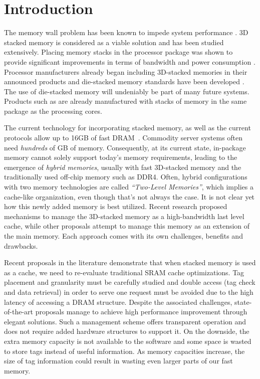 \section{Introduction}
\label{sec:Introduction}

The memory wall problem has been known to impede system performance \cite{wulf-can95}. 3D stacked memory is considered as a viable solution and has been studied extensively. Placing memory stacks in the processor package was shown to provide significant improvements in terms of bandwidth and power consumption \cite{black-micro2013}. Processor manufacturers already began including 3D-stacked memories in their announced products \cite{KnightsLanding,NVIDIA,black-micro2013} and die-stacked memory standards have been developed \cite{jedec-wideio,JEDEC-HBM,pawlowski-hotchips2011}. The use of die-stacked memory will undeniably be part of many future systems. Products such as  are already manufactured with stacks of memory in the same package as the processing cores.

The current technology for incorporating stacked memory, as well as the current protocols allow up to 16GB of
fast DRAM~\cite{KnightsLanding}. Commodity server systems often need {\em hundreds} of GB of memory. Consequently, at its current state, in-package memory cannot solely support today's memory requirements, leading to the emergence of \emph{hybrid memories}, usually with fast 3D-stacked memory and the traditionally used off-chip memory such as DDR4. Often, hybrid configurations with two memory technologies are called \emph{``Two-Level Memories''}, which implies a cache-like organization, even though that's not always the case. It is not clear yet how this newly added memory is best utilized. Recent research proposed mechanisms to manage the 3D-stacked memory as a high-bandwidth last level cache, while other proposals attempt to manage this memory as an extension of the main memory. Each approach comes with its own challenges, benefits and drawbacks. 

Recent proposals in the literature \cite{chou-micro2014,qureshi-micro2012} demonstrate that when stacked memory is used as a cache, we need to re-evaluate traditional SRAM cache optimizations. Tag placement and granularity must be carefully studied and double access (tag check and data retrieval) in order to serve one request must be avoided due to the high latency of accessing a DRAM structure. Despite the associated challenges, state-of-the-art proposals manage to achieve high performance improvement through elegant solutions. Such a management scheme offers transparent operation and does not require added hardware structures to support it. On the downside, the extra memory capacity is not available to the software and some space is wasted to store tags instead of useful information. As memory capacities increase, the size of tag information could result in wasting even larger parts of our fast memory.


